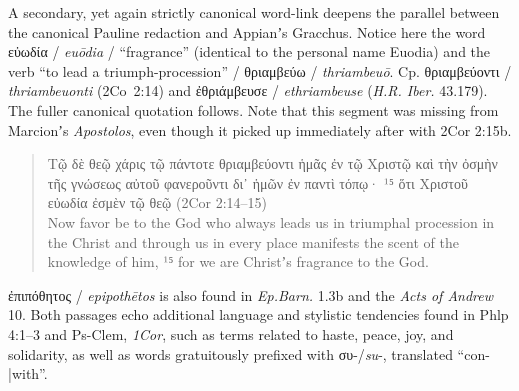 A secondary, yet again strictly canonical word-link deepens the parallel between %
the canonical Pauline redaction and Appianʼs Gracchus. %
Notice here the word εὐωδία / \textit{euōdia} / “fragrance” (identical to the personal name Euodia) %
and the verb “to lead a triumph-procession” / θριαμβεύω / \textit{thriambeuō}. %
Cp. θριαμβεύοντι / \textit{thriambeuonti} (2Co 2:14) and ἐθριάμβευσε / \textit{ethriambeuse} (\textit{H.R. Iber.} 43.179). %
The fuller canonical quotation follows. %
Note that this segment was missing from Marcionʼs \textit{Apostolos}, %
even though it picked up immediately after with 2Cor 2:15b. %

\vspace*{3mm} 
 \begin{quote}Τῷ δὲ θεῷ χάρις τῷ πάντοτε θριαμβεύοντι ἡμᾶς ἐν τῷ Χριστῷ %
 καὶ τὴν ὀσμὴν τῆς γνώσεως αὐτοῦ φανεροῦντι δι᾽ ἡμῶν ἐν παντὶ τόπῳ·
  ¹⁵ ὅτι Χριστοῦ εὐωδία ἐσμὲν τῷ θεῷ (2Cor 2:14--15) \\[1mm] %
 Now favor be to the God who always leads us in triumphal procession in the Christ %
 and through us in every place manifests the scent of the knowledge of him, 
  ¹⁵ for we are Christʼs fragrance to the God.\end{quote} %
\vspace*{3mm}

ἐπιπόθητος / \textit{epipothētos} is also found in \textit{Ep.Barn.} 1.3b and the \textit{Acts of Andrew} 10. %
Both passages echo additional language and stylistic tendencies found in Phlp 4:1--3 and Ps-Clem, \textit{1Cor}, %
such as terms related to haste, peace, joy, and solidarity, %
as well as words gratuitously prefixed with συ-/\textit{su}-, translated “con-|with”. %